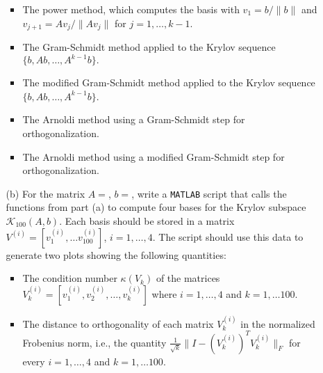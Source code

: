 \documentclass[10pt]{report}
\begin{document}
\begin{enumerate}
\begin{itemize}
\begin{itemize}
\item The power method, which computes the basis with $v_1=b/\|b\|$ and $v_{j+1}=Av_j/\|Av_j\|$ for $j=1, \ldots, k-1$. 

\item The Gram-Schmidt method applied to the Krylov sequence $\{b, Ab, \ldots, A^{k-1}b\}.$ 

\item The modified Gram-Schmidt method applied to the Krylov sequence $\{b, Ab, \ldots, A^{k-1}b\}$.
 
\item The Arnoldi method using a Gram-Schmidt step for orthogonalization.

\item The Arnoldi method using a modified Gram-Schmidt step for orthogonalization.
\end{itemize}
\pagebreak
\item[(b)] For the matrix $A= $, $b=$, write a \verb+MATLAB+ script that calls the functions from part (a) to compute four  bases for the Krylov subspace $\mathcal{K}_{100}(A,b)$. Each basis should be stored in a matrix \linebreak $V^{(i)}= [v_1^{(i)}, \ldots v_{100}^{(i)}]$, $i=1, \ldots, 4$. The script should use this data to generate two plots showing  the following quantities:

\begin{itemize}
\item The condition number $\kappa(V_k)$ of the matrices $V_k^{(i)}=[v_1^{(i)}, v_2^{(i)}, \ldots, v_k^{(i)}]$ where $i=1, \ldots, 4$ and $k=1, \ldots 100$.

\item The distance to orthogonality of each matrix  $V_{k}^{(i)}$  in the normalized  Frobenius norm, i.e., the
quantity $\frac{1}{\sqrt{k}}\|I-(V_k^{(i)})^TV_{k}^{(i)}\|_F$ for every  $i=1, \ldots, 4$ and $k=1, \ldots 100$. \end{itemize}



\end{itemize}

\end{enumerate}
\end{document}
